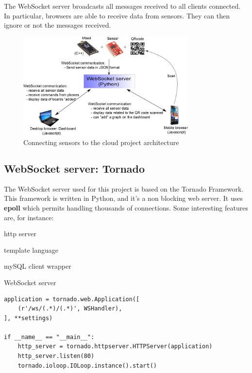 \documentclass[pdftex,10pt,a4paper]{report}
\newenvironment{packed_item}{
\begin{itemize}
  \setlength{\itemsep}{1pt}
  \setlength{\parskip}{0pt}
  \setlength{\parsep}{0pt}
}{\end{itemize}}
\begin{document}
The WebSocket server broadcasts all messages received to all clients connected. In particular, browsers are able to receive data from sensors. They can then ignore or not the messages received.

\begin{figure}[h!]
		\centering
		\includegraphics[width=0.8\textwidth]{./ws_arch.jpg}
		\caption{Connecting sensors to the cloud project architecture}
		\label{Connecting sensors to the cloud project architecture}
\end{figure}


\subsection{WebSocket server: Tornado}
The WebSocket server used for this project is based on the Tornado Framework. This framework is written in Python, and it's a non blocking web server. It uses \textbf{epoll} which permits  handling thousands of connections. Some interesting features are, for instance:
\begin{packed_item}
	\item http server
	\item template language
	\item mySQL client wrapper
	\item WebSocket server
\end{packed_item}

\begin{lstlisting}[label=Launching of an HTTP server with Tornado,caption=Launching of an HTTP server with Tornado]
application = tornado.web.Application([
    (r'/ws/(.*)/(.*)', WSHandler),
], **settings)

if __name__ == "__main__":
    http_server = tornado.httpserver.HTTPServer(application)
    http_server.listen(80)
    tornado.ioloop.IOLoop.instance().start()
\end{lstlisting}
\end{document}
